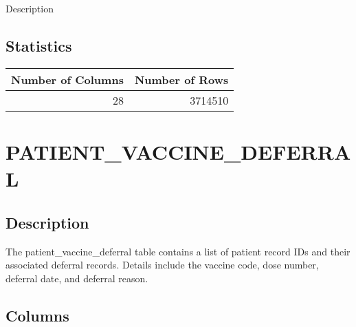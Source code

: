 \documentclass[
  letterpaper,
  DIV=11,
  numbers=noendperiod]{scrreprt}
\begin{document}
Description

\hypertarget{statistics-30}{%
\section*{Statistics}\label{statistics-30}}

\begin{longtable}{rr}
\toprule
Number of Columns & Number of Rows \\ 
\midrule
28 & 3714510 \\ 
\bottomrule
\end{longtable}

\hypertarget{patient_vaccine_deferral}{%
\chapter*{PATIENT\_VACCINE\_DEFERRAL}\label{patient_vaccine_deferral}}

\hypertarget{description-31}{%
\section*{Description}\label{description-31}}

The patient\_vaccine\_deferral table contains a list of patient record
IDs and their associated deferral records. Details include the vaccine
code, dose number, deferral date, and deferral reason.

\hypertarget{columns-31}{%
\section*{Columns}\label{columns-31}}
\end{document}
